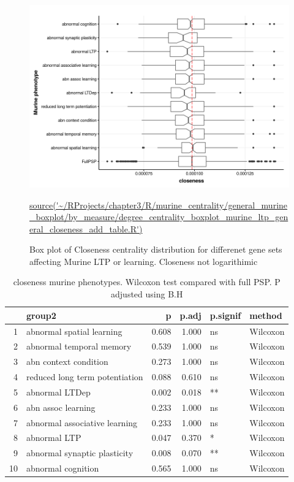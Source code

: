 \begin{figure}
    \centering
    \includegraphics[width=\textwidth]{images/chapter3/ggplot2/murine_centrality_boxplot/add_theme/addLTP/Rplot_closeness_editnolog10.png}
    \caption{Box plot of Closeness centrality distribution for differenet gene sets affecting Murine LTP or learning. Closeness not logarithimic} 
   \tiny\url{source('~/RProjects/chapter3/R/murine_centrality/general_murine_boxplot/by_measure/degree_centrality_boxplot_murine_ltp_general_closeness_add_table.R')}
    \label{fig:murine_ltp_centrality_boxplot_closeness}
\end{figure}

\begin{table}[ht]
\centering
\begin{tabular}{rlrrll}
  \toprule
 & group2 & p & p.adj & p.signif & method \\ 
  \midrule
1 & abnormal spatial learning & 0.608 & 1.000 & ns & Wilcoxon \\ 
  2 & abnormal temporal memory & 0.539 & 1.000 & ns & Wilcoxon \\ 
  3 & abn context condition & 0.273 & 1.000 & ns & Wilcoxon \\ 
  4 & reduced long term potentiation & 0.088 & 0.610 & ns & Wilcoxon \\ 
  5 & abnormal LTDep & 0.002 & 0.018 & ** & Wilcoxon \\ 
  6 & abn assoc learning & 0.233 & 1.000 & ns & Wilcoxon \\ 
  7 & abnormal associative learning & 0.233 & 1.000 & ns & Wilcoxon \\ 
  8 & abnormal LTP & 0.047 & 0.370 & * & Wilcoxon \\ 
  9 & abnormal synaptic plasticity & 0.008 & 0.070 & ** & Wilcoxon \\ 
  10 & abnormal cognition & 0.565 & 1.000 & ns & Wilcoxon \\ 
   \bottomrule
\end{tabular}
\caption{closeness murine phenotypes. Wilcoxon test compared with full PSP. P adjusted using B.H} 
\label{tab:closeness murine phenotypes. Wilcoxon test compared with full PSP.}
\end{table}

